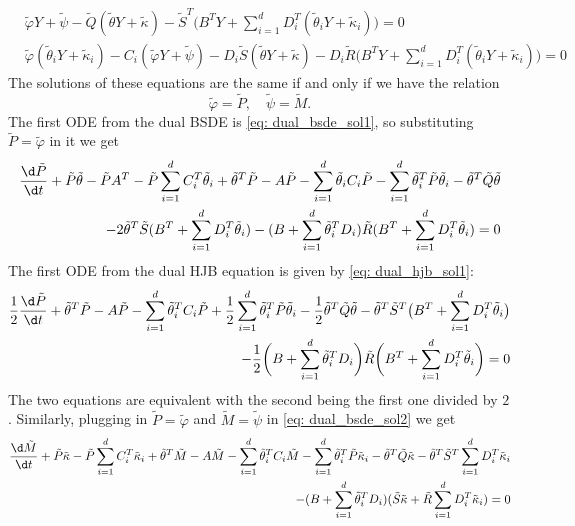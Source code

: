\begin{align*}
    &\tilde{\varphi} Y + \tilde{\psi} - \tilde{Q}(\tilde{\theta} Y + \tilde{\kappa}) - \tilde{S}^T \bigg(B^T Y + \sum_{i=1}^d D_i^T (\tilde{\theta}_i Y + \tilde{\kappa}_i)\bigg)= 0\\
    &\tilde{\varphi}( \tilde{\theta}_i Y +  \tilde{\kappa}_i) - C_i (\tilde{\varphi} Y + \tilde{\psi}) - D_i \tilde{S}(\tilde{\theta} Y + \tilde{\kappa}) - D_i \tilde{R}\bigg(B^T Y + \sum_{i=1}^d D_i^T (\tilde{\theta}_iY + \tilde{\kappa}_i)\bigg) = 0
\end{align*}
The solutions of these equations are the same if and only  if we have the relation
\begin{equation*}
    \tilde{\varphi} = \tilde{P}, \quad \tilde{\psi} = \tilde{M}.
\end{equation*}
The first ODE from the dual BSDE is \eqref{eq: dual_bsde_sol1}, so substituting $\tilde{P} = \tilde{\varphi}$ in it we get 
\begin{align*}
    \frac{\d \tilde{P}}{\d t} + \tilde{P} \tilde{\theta} - \tilde{P} A^T - \tilde{P} \sum_{i=1}^d C_i^T \tilde{\theta}_i + \tilde{\theta}^T \tilde{P} - A \tilde{P} -\sum_{i=1}^d \tilde{\theta}_i C_i \tilde{P} - \sum_{i=1}^d\tilde{\theta}_i^T\tilde{P} \tilde{\theta}_i - \tilde{\theta}^T \tilde{Q}\tilde{\theta}\\
    - 2\tilde{\theta}^T \tilde{S}(B^T + \sum_{i=1}^d D_i^T \tilde{\theta}_i) - (B + \sum_{i=1}^d\tilde{\theta}_i^T D_i)\tilde{R} (B^T + \sum_{i=1}^d D_i^T \tilde{\theta}_i) = 0
\end{align*}
The first ODE from the dual HJB equation is given by \eqref{eq: dual_hjb_sol1}:
\begin{align*}
    \frac12 \frac{\d \tilde{P}}{\d t} + \tilde{\theta}^T \tilde{P} - A \tilde{P}  - \sum_{i=1}^d \tilde{\theta}_i^T C_i \tilde{P} + \frac12 \sum_{i=1}^d \tilde{\theta}_i^T \tilde{P} \tilde{\theta}_i - \frac12 \tilde{\theta}^T \tilde{Q}\tilde{\theta} - \tilde{\theta}^T \tilde{S}^T \big(B^T + \sum_{i=1}^d D_i^T \tilde{\theta}_i \big)\\
    - \frac12 \bigg(B + \sum_{i=1}^d\tilde{\theta}_i^T D_i\bigg) \tilde{R} \bigg(B^T + \sum_{i=1}^d D_i^T \tilde{\theta}_i\bigg) = 0
\end{align*}
The two equations are equivalent with the second being the first one divided by $2$. Similarly, plugging in $\tilde{P} = \tilde{\varphi}$ and $\tilde{M} = \tilde{\psi}$ in \eqref{eq: dual_bsde_sol2} we get
\begin{align*}
    \frac{\d \tilde{M}}{\d t} + \tilde{P} \tilde{\kappa} - \tilde{P} \sum_{i=1}^d C_i^T \tilde{\kappa}_i + \tilde{\theta}^T \tilde{M} - A \tilde{M} - \sum_{i=1}^d \tilde{\theta}_i^T C_i \tilde{M} - \sum_{i=1}^d \tilde{\theta}_i^T \tilde{P} \tilde{\kappa}_i-\tilde{\theta}^T \tilde{Q} \tilde{\kappa} - \tilde{\theta}^T \tilde{S}^T\sum_{i=1}^d D_i^T\tilde{\kappa}_i\\
    - (B + \sum_{i=1}^d\tilde{\theta}_i^T D_i) (\tilde{S}\tilde{\kappa} + \tilde{R} \sum_{i=1}^d D_i^T \tilde{\kappa}_i) = 0
\end{align*}
